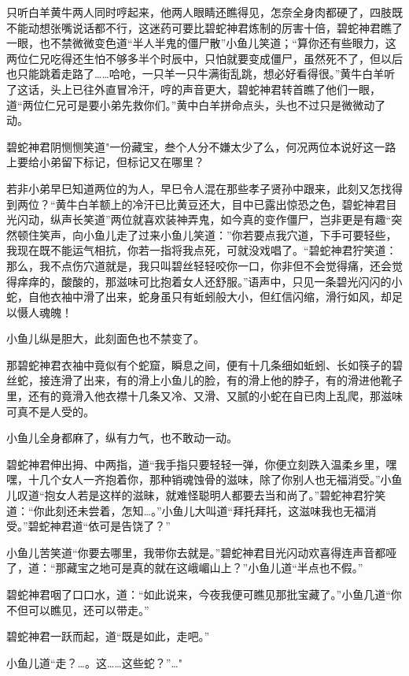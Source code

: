 \documentclass[12pt,oneside]{book}
\begin{document}
只听白羊黄牛两人同时哼起来，他两人眼睛还瞧得见，怎奈全身肉都硬了，四肢既不能动想张嘴说话都不行，这迷药可要比碧蛇神君炼制的厉害十倍，碧蛇神君瞧了一眼，也不禁微微变色道``半人半鬼的僵尸散''小鱼儿笑道；``算你还有些眼力，这两位仁兄吃得还生怕不够多半个时辰中，只怕就要变成僵尸，虽然死不了，但以后也只能跳着走路了\ldots\ldots 哈呛，一只羊一只牛满街乱跳，想必好看得很。''黄牛白羊听了这话，头上已往外直冒冷汗，哼的声音更大，碧蛇神君转首瞧了他们一眼，道``两位仁兄可是要小弟先救你们。''黄中白羊拼命点头，头也不过只是微微动了动。

碧蛇神君阴恻恻笑道"一份藏宝，叁个人分不嫌太少了么，何况两位本说好这一路上要给小弟留下标记，但标记又在哪里？

若非小弟早巳知道两位的为人，早巳令人混在那些孝子贤孙中跟来，此刻又怎找得到两位？``黄牛白羊额上的冷汗已比黄豆还大，目中已露出惊恐之色，碧蛇神君目光闪动，纵声长笑道''两位就喜欢装神弄鬼，如今真的变作僵尸，岂非更是有趣``突然顿住笑声，向小鱼儿走了过来小鱼儿笑道：''你若要点我穴道，下手可要轻些，我现在既不能运气相抗，你若一指将我点死，可就没戏唱了。``碧蛇神君狞笑道：那么，我不点伤穴道就是，我只叫碧丝轻轻咬你一口，你非但不会觉得痛，还会觉得痒痒的，酸酸的，那滋味可比抱着女人还舒服。''语声中，只见一条碧光闪闪的小蛇，自他衣袖中滑了出来，蛇身虽只有蚯蚓般大小，但红信闪缩，滑行如风，却足以慑人魂魄！

小鱼儿纵是胆大，此刻面色也不禁变了。

那碧蛇神君衣袖中竟似有个蛇窟，瞬息之间，便有十几条细如蚯蚓、长如筷子的碧丝蛇，接连滑了出来，有的滑上小鱼儿的脸，有的滑上他的脖子，有的滑进他靴子里，还有的竟滑入他衣襟十几条又冷、又滑、又腻的小蛇在自已肉上乱爬，那滋味可真不是人受的。

小鱼儿全身都麻了，纵有力气，也不敢动一动。

碧蛇神君伸出拇、中两指，道``我手指只要轻轻一弹，你便立刻跌入温柔乡里，嘿嘿，十几个女人一齐抱着你，那种销魂蚀骨的滋味，除了你别人也无福消受。''小鱼儿叹道``抱女人若是这样的滋昧，就难怪聪明人都要去当和尚了。''碧蛇神君狞笑道：``你此刻还未尝着，怎知\ldots。''小鱼儿大叫道``拜托拜托，这滋味我也无福消受。''碧蛇神君道``依可是告饶了？''

小鱼儿苦笑道``你要去哪里，我带你去就是。''碧蛇神君目光闪动欢喜得连声音都哑了，道：``那藏宝之地可是真的就在这峨嵋山上？''小鱼儿道``半点也不假。''

碧蛇神君咽了口口水，道：``如此说来，今夜我便可瞧见那批宝藏了。''小鱼几道``你不但可以瞧见，还可以带走。''

碧蛇神君一跃而起，道``既是如此，走吧。''

小鱼儿道``走？\ldots。这\ldots\ldots 这些蛇？''\ldots"
\end{document}
